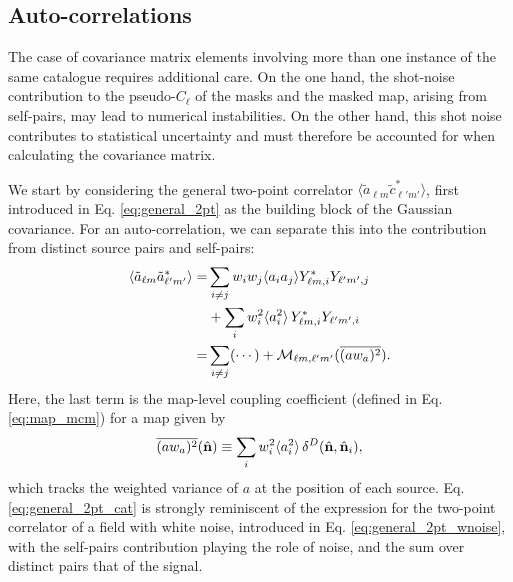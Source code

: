 \documentclass[%
 reprint,
superscriptaddress,
nofootinbib,
 amsmath,amssymb,
 aps,
 prd,
]{revtex4-2}
\newcommand{\nv}{\hat{\bf n}}
\begin{document}
  \subsection{Auto-correlations}\label{ssec:theo.allsame}
    The case of covariance matrix elements involving more than one instance of the same catalogue requires additional care. On the one hand, the shot-noise contribution to the pseudo-$C_\ell$ of the masks and the masked map, arising from self-pairs, may lead to numerical instabilities. On the other hand, this shot noise contributes to statistical uncertainty and must therefore be accounted for when calculating the covariance matrix.

    We start by considering the general two-point correlator $\langle\tilde{a}_{\ell m}\tilde{c}^*_{\ell'm'}\rangle$, first introduced in Eq. \ref{eq:general_2pt} as the building block of the Gaussian covariance. For an auto-correlation, we can separate this into the contribution from distinct source pairs and self-pairs:
    \begin{align}\nonumber
      \langle \tilde{a}_{\ell m}\tilde{a}^*_{\ell'm'}\rangle
      =&\sum_{i\neq j}w_iw_j\langle a_ia_j\rangle Y^*_{\ell m,i}Y_{\ell'm',j}\\\nonumber
      &+\sum_i w_i^2\langle a_i^2\rangle\,Y^*_{\ell m,i}Y_{\ell'm',i}\\\label{eq:general_2pt_cat}
      =&\sum_{i\neq j}(\cdots)+{\cal M}_{\ell m,\ell'm'}(\overline{(aw_a)^2}).
    \end{align}
    Here, the last term is the map-level coupling coefficient (defined in Eq. \ref{eq:map_mcm}) for a map given by
    \begin{equation}\label{eq:self_var}
      \overline{(aw_a)^2}(\nv)\equiv\sum_i w^2_i\langle a_i^2\rangle\,\delta^D(\nv,\nv_i),
    \end{equation}
    which tracks the weighted variance of $a$ at the position of each source. Eq. \ref{eq:general_2pt_cat} is strongly reminiscent of the expression for the two-point correlator of a field with white noise, introduced in Eq. \ref{eq:general_2pt_wnoise}, with the self-pairs contribution playing the role of noise, and the sum over distinct pairs that of the signal.
\end{document}
